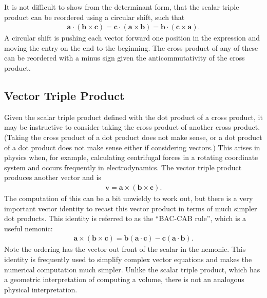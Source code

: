 It is not difficult to show from the determinant form, that the scalar triple product can be reordered using a circular shift, such that
\begin{align}
  \mathbf{a} \cdot ( \mathbf{b} \times \mathbf{c} ) = \mathbf{c} \cdot ( \mathbf{a} \times \mathbf{b} ) = \mathbf{b} \cdot ( \mathbf{c} \times \mathbf{a} ) .
\end{align}
A circular shift is pushing each vector forward one position in the expression and moving the entry on the end to the beginning. The cross product of any of these can be reordered with a minus sign given the anticommutativity of the cross product.

\subsection{Vector Triple Product}

Given the scalar triple product defined with the dot product of a cross product, it may be instructive to consider taking the cross product of another cross product. (Taking the cross product of a dot product does not make sense, or a dot product of a dot product does not make sense either if considering vectors.) This arises in physics when, for example, calculating centrifugal forces in a rotating coordinate system and occurs frequently in electrodynamics. The vector triple product produces another vector and is
\begin{align}
  \mathbf{v} = \mathbf{a} \times ( \mathbf{b} \times \mathbf{c} ) .
\end{align}
The computation of this can be a bit unwieldy to work out, but there is a very important vector identity to recast this vector product in terms of much simpler dot products. This identity is referred to as the ``BAC-CAB rule'', which is a useful nemonic:
\begin{align}
  \mathbf{a} \times ( \mathbf{b} \times \mathbf{c} ) = \mathbf{b} \left( \mathbf{a} \cdot \mathbf{c} \right)  - \mathbf{c} \left( \mathbf{a} \cdot \mathbf{b} \right) .
\end{align}
Note the ordering has the vector out front of the scalar in the nemonic. This identity is frequently used to simplify complex vector equations and makes the numerical computation much simpler. Unlike the scalar triple product, which has a geometric interpretation of computing a volume, there is not an analogous physical interpretation.

